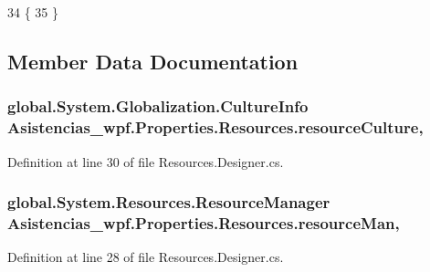 \begin{DoxyCode}
34         \{
35         \}
\end{DoxyCode}


\subsection{Member Data Documentation}
\hypertarget{class_asistencias__wpf_1_1_properties_1_1_resources_acafe43323281384386537aa0bca0c108}{
\subsubsection[{resource\-Culture}]{\setlength{\rightskip}{0pt plus 5cm}global.\-System.\-Globalization.\-Culture\-Info Asistencias\-\_\-wpf.\-Properties.\-Resources.\-resource\-Culture\hspace{0.3cm}{\ttfamily [static]}, {\ttfamily [private]}}}\label{class_asistencias__wpf_1_1_properties_1_1_resources_acafe43323281384386537aa0bca0c108}


Definition at line 30 of file Resources.\-Designer.\-cs.

\hypertarget{class_asistencias__wpf_1_1_properties_1_1_resources_a759c6e3731960744ed37593dbf13f22c}{
\subsubsection[{resource\-Man}]{\setlength{\rightskip}{0pt plus 5cm}global.\-System.\-Resources.\-Resource\-Manager Asistencias\-\_\-wpf.\-Properties.\-Resources.\-resource\-Man\hspace{0.3cm}{\ttfamily [static]}, {\ttfamily [private]}}}\label{class_asistencias__wpf_1_1_properties_1_1_resources_a759c6e3731960744ed37593dbf13f22c}


Definition at line 28 of file Resources.\-Designer.\-cs.




